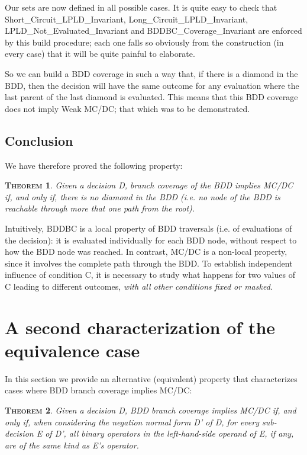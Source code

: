 \documentclass[a4paper,12pt,twoside]{article}
\newtheorem{theorem}{\textsc{Theorem}}
\begin{document}
Our sets are now defined in all possible cases. It is quite easy to
check that Short\_Circuit\_LPLD\_Invariant,
Long\_Circuit\_LPLD\_Invariant, LPLD\_Not\_Evaluated\_Invariant and
BDDBC\_Coverage\_Invariant are enforced by this build procedure; each
one falls so obviously from the construction (in every case) that it
will be quite painful to elaborate.

So we can build a BDD coverage in such a way that, if there is a
diamond in the BDD, then the decision will have the same outcome for
any evaluation where the last parent of the last diamond is
evaluated. This means that this BDD coverage does not imply Weak
MC/DC; that which was to be demonstrated.

\subsection{Conclusion}

We have therefore proved the following property:

\begin{theorem}
  \label{thm:no-diamond}
  Given a decision D, branch coverage of the BDD implies MC/DC if,
  and only if, there is no diamond in the BDD (i.e.  no node of the
  BDD is reachable through more that one path from the root).
\end{theorem}

Intuitively, BDDBC is a local property of BDD traversals (i.e. of
evaluations of the decision): it is evaluated individually for each
BDD node, without respect to how the BDD node was reached. In
contrast, MC/DC is a non-local property, since it involves the
complete path through the BDD. To establish independent influence of
condition C, it is necessary to study what happens for two values of C
leading to different outcomes, \emph{with all other conditions fixed
or masked}.

\section{A second characterization of the equivalence case}

In this section we provide an alternative (equivalent) property
that characterizes cases where BDD branch coverage implies MC/DC:

\begin{theorem}
  \label{thm:lhs-same-operator}
  Given a decision D, BDD branch coverage implies MC/DC if, and only if, when
  considering the negation normal form D' of D, for every sub-decision E of D',
  all binary operators in the left-hand-side operand of E, if any, are of the
  same kind as E's operator.
\end{theorem}
\end{document}
